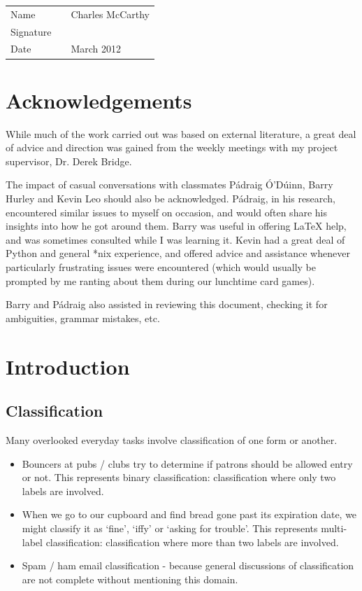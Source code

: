 \documentclass[a4paper,11pt]{report}
\begin{document}
{
\renewcommand{\arraystretch}{4.5}
\begin{center}
 	\begin{tabular}{l @{:} p{0.4in} l}
		Name & & Charles McCarthy \\
		Signature & & \makebox[2.5in]{\hrulefill} \\
		Date & & March 2012 \\
	\end{tabular}
\end{center}
}
\vspace{\fill}

\chapter*{Acknowledgements}
While much of the work carried out was based on external literature, a great deal of advice and direction was gained from the weekly meetings with my project supervisor, Dr. Derek Bridge.

The impact of casual conversations with classmates P\'{a}draig \'{O}'D\'uinn, Barry Hurley and Kevin Leo should also be acknowledged. P\'{a}draig, in his research, encountered similar issues to myself on occasion, and would often share his insights into how he got around them. Barry was useful in offering \LaTeX{} help, and was sometimes consulted while I was learning it. Kevin had a great deal of Python and general *nix experience, and offered advice and assistance whenever particularly frustrating issues were encountered (which would usually be prompted by me ranting about them during our lunchtime card games).

Barry and P\'{a}draig also assisted in reviewing this document, checking it for ambiguities, grammar mistakes, etc.

\tableofcontents

\chapter{Introduction}

\section{Classification}

Many overlooked everyday tasks involve classification of one form or another. 
\begin{itemize}
	\item Bouncers at pubs / clubs try to determine if patrons should be allowed entry or not. This represents binary classification: classification where only two labels are involved.
	\item When we go to our cupboard and find bread gone past its expiration date, we might classify it as `fine', `iffy' or `asking for trouble'. This represents multi-label classification: classification where more than two labels are involved.
	\item Spam / ham email classification - because general discussions of classification are not complete without mentioning this domain.
\end{itemize}
\end{document}
